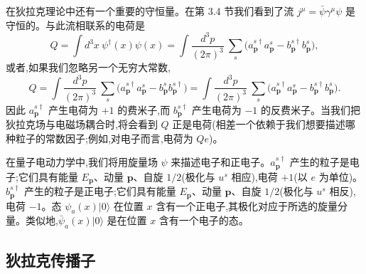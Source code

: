 在狄拉克理论中还有一个重要的守恒量。在第 3.4 节我们看到了流 $j^\mu = \bar{\psi}\gamma^\mu\psi$ 是守恒的。与此流相联系的电荷是
\begin{equation}
  Q = \int d^3x\ \psi^\dagger(x)\psi(x)
    = \int \frac{d^3p}{(2\pi)^3}\ \sum_s
      \bigl( a_{\mathbf{p}}^{s\dagger}a_{\mathbf{p}}^s
        - b_{\mathbf{p}}^{s\dagger}b_{\mathbf{p}}^s \bigr),
  \label{eq:3.113}
\end{equation}
或者,如果我们忽略另一个无穷大常数,
\begin{equation}
  Q = \int \frac{d^3p}{(2\pi)^3}\ \sum_s
    \bigl( a_{\mathbf{p}}^{s\dagger}a_{\mathbf{p}}^s
      - b_{\mathbf{p}}^s b_{\mathbf{p}}^{s\dagger} \bigr)
    = \int \frac{d^3p}{(2\pi)^3}\ \sum_s
      \bigl( a_{\mathbf{p}}^{s\dagger}a_{\mathbf{p}}^s
        - b_{\mathbf{p}}^{s\dagger}b_{\mathbf{p}}^s \bigr).
  \label{eq:3.114}
\end{equation}
因此 $a_{\mathbf{p}}^{s\dagger}$ 产生电荷为 $+1$ 的费米子,而 $b_{\mathbf{p}}^{s\dagger}$ 产生电荷为 $-1$ 的反费米子。当我们把狄拉克场与电磁场耦合时,将会看到 $Q$ 正是电荷(相差一个依赖于我们想要描述哪种粒子的常数因子;例如,对电子而言,电荷为 $Qe$)。

在量子电动力学中,我们将用旋量场 $\psi$ 来描述电子和正电子。$a_{\mathbf{p}}^{s\dagger}$ 产生的粒子是电子;它们具有能量 $E_{\mathbf{p}}$、动量 $\mathbf{p}$、自旋 $1/2$(极化与 $u^s$ 相应),电荷 $+1$(以 $e$ 为单位)。$b_{\mathbf{p}}^{s\dagger}$ 产生的粒子是正电子;它们具有能量 $E_{\mathbf{p}}$、动量 $\mathbf{p}$、自旋 $1/2$(极化与 $u^s$ 相反),电荷 $-1$。态 $\psi_a(x)|0\rangle$ 在位置 $x$ 含有一个正电子,其极化对应于所选的旋量分量。类似地,$\bar{\psi}_a(x)|0\rangle$ 是在位置 $x$ 含有一个电子的态。

\subsection{狄拉克传播子}

